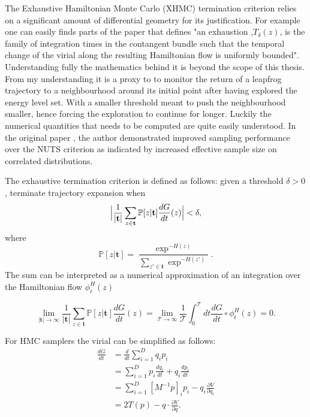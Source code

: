 \documentclass[12pt]{report}
\begin{document}
The Exhaustive Hamiltonian Monte Carlo (XHMC) termination criterion  relies on a significant amount of differential geometry for its justification. For example one can easily finds parts of the paper \cite{betancourt2016identifying} that defines "an exhaustion ,$T_{\delta}(z)$, is the family of integration times in the contangent bundle such that the temporal change of the virial along the resulting Hamiltonian flow is uniformly bounded". Understanding fully the mathematics behind it is beyond the scope of this thesis. From my understanding it is a proxy to to monitor the return of a leapfrog trajectory to a neighbourhood around its initial point after having explored the energy level set. With a smaller threshold meant to push the neighbourhood smaller, hence forcing the exploration to continue for longer. Luckily the numerical quantities that needs to be computed are quite easily understood. In the original paper \cite{betancourt2016identifying}, the author demonstrated improved sampling performance over the NUTS criterion as indicated by increased effective sample size on correlated distributions. 

The exhaustive termination criterion is defined as follows: given a threshold $\delta > 0$, terminate trajectory expansion when 
\[  \Bigl |\frac{1}{|\mathbf{t}|} \sum_{z \in \mathbf{t}} \mathbb{P}[z | \mathbf{t}] \frac{dG}{dt}(z) \Bigr | < \delta, \]
where 
\[ \mathbb{P}[z| \mathbf{t}] = \frac{\exp^{-H(z)}}{\sum_{z' \in \mathbf{t}} \exp^{-H(z')}}. \]
The sum can be interpreted as a numerical approximation of an integration over the Hamiltonian flow $\phi_{t}^H(z)$

\[ \lim_{|\mathbf{t}| \rightarrow \infty} \frac{1}{|\mathbf{t}|} \sum_{z \in \mathbf{t}} \mathbb{P}[z | \mathbf{t}] \frac{dG}{dt}(z)  = \lim_{\mathcal{T} \rightarrow \infty} \frac{1}{\mathcal{T}} \int_0^\mathcal{T} dt \frac{dG}{dt} \circ \phi_{t}^H(z) = 0. \]

For HMC samplers the virial can be simplified as follows:
\begin{align*}
 \frac{dG}{dt} &= \frac{d}{dt}\sum_{i=1}^D q_i p_i \\
 &= \sum_{i=1}^D p_i \frac{dq_i}{dt} + q_i \frac{dp_i}{dt} \\
 &= \sum_{i=1}^D [M^{-1}p]_i p_i - q_i \frac{\partial V}{\partial q_i} \\
 &= 2 T(p) - q \cdot \frac{\partial V}{\partial q}.\\
\end{align*}
\end{document}
